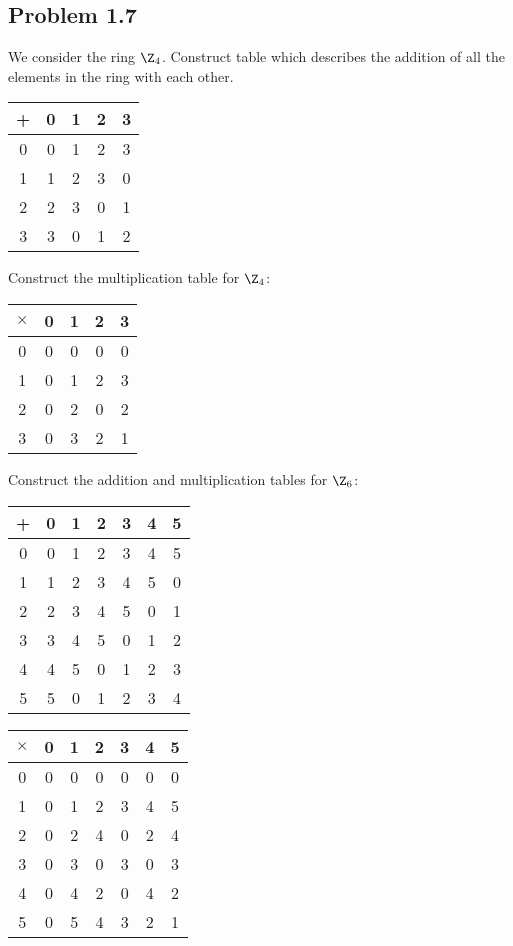 \documentclass{math}
\begin{document}
\subsection*{Problem 1.7}
We consider the ring \( \Z_4 \). Construct table which describes the addition of
all the elements in the ring with each other.
\begin{center}
  \begin{tabular}{c|cccc}
    + & 0 & 1 & 2 & 3 \\ \hline
    0 & 0 & 1 & 2 & 3 \\
    1 & 1 & 2 & 3 & 0 \\
    2 & 2 & 3 & 0 & 1 \\
    3 & 3 & 0 & 1 & 2
  \end{tabular}
\end{center}
Construct the multiplication table for \( \Z_4 \):
\begin{center}
  \begin{tabular}{c|cccc}
    \( \times \) & 0 & 1 & 2 & 3 \\ \hline
    0 & 0 & 0 & 0 & 0 \\
    1 & 0 & 1 & 2 & 3 \\
    2 & 0 & 2 & 0 & 2 \\
    3 & 0 & 3 & 2 & 1 \\
  \end{tabular}
\end{center}
Construct the addition and multiplication tables for \( \Z_6 \): \\[1cm]
\begin{minipage}[c]{8cm}
  \begin{center}
    \begin{tabular}{c|cccccc}
      + & 0 & 1 & 2 & 3 & 4 & 5 \\ \hline
      0 & 0 & 1 & 2 & 3 & 4 & 5 \\
      1 & 1 & 2 & 3 & 4 & 5 & 0 \\
      2 & 2 & 3 & 4 & 5 & 0 & 1 \\
      3 & 3 & 4 & 5 & 0 & 1 & 2 \\
      4 & 4 & 5 & 0 & 1 & 2 & 3 \\
      5 & 5 & 0 & 1 & 2 & 3 & 4 \\
    \end{tabular}
  \end{center}
\end{minipage}
\begin{minipage}[c]{8cm}
  \begin{tabular}{c|cccccc}
    \( \times \) & 0 & 1 & 2 & 3 & 4 & 5 \\ \hline
    0 & 0 & 0 & 0 & 0 & 0 & 0 \\
    1 & 0 & 1 & 2 & 3 & 4 & 5 \\
    2 & 0 & 2 & 4 & 0 & 2 & 4 \\
    3 & 0 & 3 & 0 & 3 & 0 & 3 \\
    4 & 0 & 4 & 2 & 0 & 4 & 2 \\
    5 & 0 & 5 & 4 & 3 & 2 & 1 \\
  \end{tabular}
\end{minipage}
\end{document}
